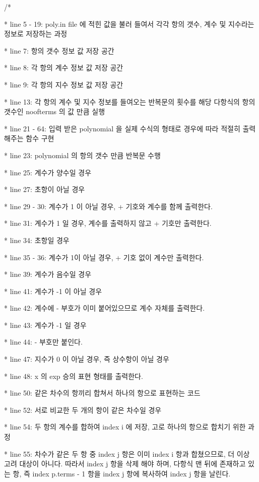 \documentclass[twoside,twocolumn]{article}
\newenvironment{itemizeReduced}{
\begin{list}{\labelitemi}{\leftmargin=1em}
\setlength{\itemsep}{1pt}
\setlength{\parskip}{0pt}
\setlength{\parsep}{0pt}}{\end{list}
}
\begin{document}
\begin{itemizeReduced}
    \item[/*] 
    \item[*] line 5 - 19: poly.in file 에 적힌 값을 불러 들여서 각각 항의 갯수, 계수 및 지수라는 정보로 저장하는 과정
    \item[*] line 7: 항의 갯수 정보 값 저장 공간
    \item[*] line 8: 각 항의 계수 정보 값 저장 공간
    \item[*] line 9: 각 항의 지수 정보 값 저장 공간
    \item[*] line 13: 각 항의 계수 및 지수 정보를 들여오는 반복문의 횟수를 해당 다항식의 항의 갯수인 noofterms 의 값 만큼 실행
    \item[*] line 21 - 64: 입력 받은 polynomial 을 실제 수식의 형태로 경우에 따라 적절히 출력 해주는 함수 구현
    \item[*] line 23: polynomial 의 항의 갯수 만큼 반복문 수행
    \item[*] line 25: 계수가 양수일 경우
    \item[*] line 27: 초항이 아닐 경우
    \item[*] line 29 - 30: 계수가 1 이 아닐 경우, + 기호와 계수를 함께 출력한다.
    \item[*] line 31: 계수가 1 일 경우, 계수를 출력하지 않고 + 기호만 출력한다.
    \item[*] line 34: 초항일 경우
    \item[*] line 35 - 36: 계수가 1이 아닐 경우, + 기호 없이 계수만 출력한다.
    \item[*] line 39: 계수가 음수일 경우
    \item[*] line 41: 계수가 -1 이 아닐 경우
    \item[*] line 42: 계수에 - 부호가 이미 붙어있으므로 계수 자체를 출력한다.
    \item[*] line 43: 계수가 -1 일 경우
    \item[*] line 44: - 부호만 붙인다.
    \item[*] line 47: 지수가 0 이 아닐 경우, 즉 상수항이 아닐 경우
    \item[*] line 48: x 의 exp 승의 표현 형태를 출력한다.
    \item[*] line 50: 같은 차수의 항끼리 합쳐서 하나의 항으로 표현하는 코드
    \item[*] line 52: 서로 비교한 두 개의 항이 같은 차수일 경우
    \item[*] line 54: 두 항의 계수를 합하여 index i 에 저장, 고로 하나의 항으로 합치기 위한 과정
    \item[*] line 55: 차수가 같은 두 항 중 index j 항은 이미 index i 항과 합쳤으므로, 더 이상 고려 대상이 아니다. 따라서 index j 항을 삭제 해야 하며, 다항식 맨 뒤에 존재하고 있는 항, 즉 index p.terms - 1 항을 index j 항에 복사하여 index j 항을 날린다.

\end{itemizeReduced}
\end{document}
